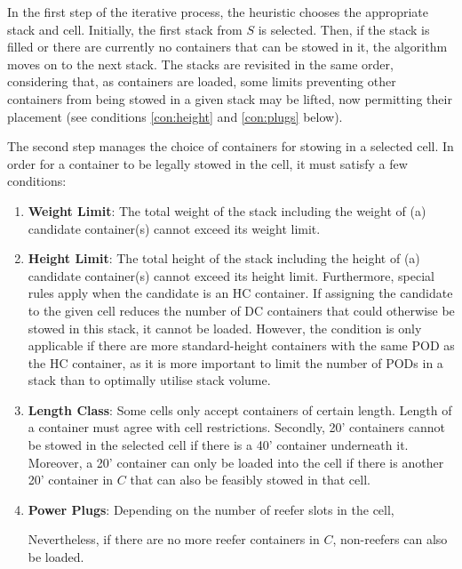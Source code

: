 \documentclass[preprint,12pt,3p]{elsarticle}
\begin{document}
In the first step of the iterative process, the heuristic chooses the appropriate stack and cell. Initially, the first stack from $S$ is selected. Then, if the stack is filled or there are currently no containers that can be stowed in it, the algorithm moves on to the next stack. The stacks are revisited in the same order, considering that, as containers are loaded, some limits preventing other containers from being stowed in a given stack may be lifted, now permitting their placement (see conditions \ref{con:height} and \ref{con:plugs} below). 

The second step manages the choice of containers for stowing in a selected cell. In order for a container to be legally stowed in the cell, it must satisfy a few conditions:
\begin{enumerate}[noitemsep]
    \item \textbf{Weight Limit}: The total weight of the stack including the weight of (a) candidate container(s) cannot exceed its weight limit.
    \item \label{con:height} \textbf{Height Limit}: The total height of the stack including the height of (a) candidate container(s) cannot exceed its height limit. Furthermore, special rules apply when the candidate is an HC container. If assigning the candidate to the given cell reduces the number of DC containers that could otherwise be stowed in this stack, it cannot be loaded. However, the condition is only applicable if there are more standard-height containers with the same POD as the HC container, as it is more important to limit the number of PODs in a stack than to optimally utilise stack volume.
    \item \textbf{Length Class}: Some cells only accept containers of certain length. Length of a container must agree with cell restrictions. Secondly, 20' containers cannot be stowed in the selected cell if there is a 40' container underneath it. Moreover, a 20' container can only be loaded into the cell if there is another 20' container in $C$ that can also be feasibly stowed in that cell.
    \item \label{con:plugs} \textbf{Power Plugs}: Depending on the number of reefer slots in the cell,
    Nevertheless, if there are no more reefer containers in $C$, non-reefers can also be loaded.    
\end{enumerate}
\end{document}
